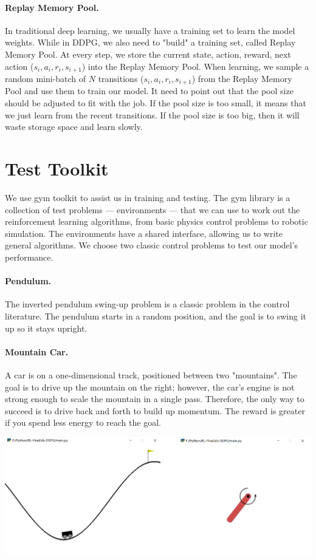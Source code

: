 \documentclass[a4paper,12pt,oneside,article]{memoir}
\newcommand{\mybold}[1]{\paragraph{#1.}} %
\begin{document}
\mybold{Replay Memory Pool}
In traditional deep learning, we usually have a training set to learn the model weights. While in DDPG, we also need to "build" a training set, called Replay Memory Pool. At every step, we store the current state, action, reward, next action ($s_i, a_i, r_i, s_{i+1}$) into the Replay Memory Pool. When learning, we sample a random mini-batch of $N$ transitions ($s_i, a_i, r_i, s_{i+1}$) from the Replay Memory Pool and use them to train our model. It need to point out that the pool size should be adjusted to fit with the job. If the pool size is too small, it means that we just learn from the recent transitions. If the pool size is too big, then it will waste storage space and learn slowly.


\section{Test Toolkit}
We use gym toolkit to assist us in training and testing. The gym library is a collection of test problems — environments — that we can use to work out the reinforcement learning algorithms, from basic physics control problems to robotic simulation. The environments have a shared interface, allowing us to write general algorithms. We choose two classic control problems to test our model's performance.
\mybold{Pendulum} The inverted pendulum swing-up problem is a classic problem in the control literature. The pendulum starts in a random position, and the goal is to swing it up so it stays upright.
\mybold{Mountain Car} A car is on a one-dimensional track, positioned between two "mountains". The goal is to drive up the mountain on the right; however, the car's engine is not strong enough to scale the mountain in a single pass. Therefore, the only way to succeed is to drive back and forth to build up momentum. The reward is greater if you spend less energy to reach the goal.

\begin{center}
\includegraphics[width=15cm]{gym.png}
\label{fig:smiley}
\end{center}
\end{document}
